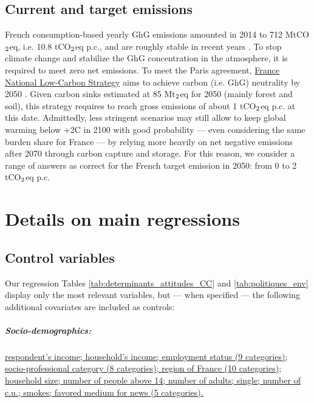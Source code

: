 \documentclass[english,5p,authoryear]{elsarticle}
\begin{document}
\begin{appendices}
\subsection{Current and target emissions\label{app:emission}}

French consumption-based yearly GhG emissions amounted in 2014 to 712 MtCO$_\textnormal{2}$eq, i.e. 10.8 tCO$_\textnormal{2}$eq p.c., and are roughly stable in recent years \citep{cgdd_chiffres_2019}. To stop climate change and stabilize the GhG concentration in the atmosphere, it is required to meet zero net emissions. To meet the Paris agreement,  \href{https://www.ecologique-solidaire.gouv.fr/strategie-nationale-bas-carbone-snbc}{France National Low-Carbon Strategy} aims to achieve carbon (i.e. GhG) neutrality by 2050 \citep{ministry_of_ecology_france_2015}. Given carbon sinks estimated at 85 Mt$_\textnormal{2}$eq for 2050 (mainly forest and soil), this strategy requires to reach gross emissions of about 1 tCO$_\textnormal{2}$eq p.c. at this date. Admittedly, less stringent scenarios may still allow to keep global warming below +2\textdegree{}C in 2100 with good probability --- even considering the same burden share for France --- by relying more heavily on net negative emissions after 2070 through carbon capture and storage. For this reason, we consider a range of answers as correct for the French target emission in 2050: from 0 to 2 tCO$_\textnormal{2}$eq p.c.

%

%
%
%
%
%
%
%
%
%
%
%
%
%
%
%
%
%
%
%
%
%
%



%
%
%
%
%
%
%
%
%
%
%
%
%
%
%
%
%
%
%
%
%
%
%
%
%
%
%
%
%
%
%
%
%
%
%
%
%
%
%
%
%
%
%
%
%
%
%
%
%
%
%
%
%
%
%
%
%

\section{Details on main regressions}
\subsection{Control variables\label{app:covariates}}

Our regression Tables \ref{tab:determinants_attitudes_CC} and \ref{tab:politiques_env} display only the most relevant variables, but --- when specified --- the following additional covariates are included as controls:

\subparagraph{Socio-demographics:} \uline{respondent's income; household's income; employment status \textnormal{(9 categories)}; socio-professional category \textnormal{(8 categories)}; region of France \textnormal{(10 categories)}; household size; number of people above 14; number of adults; single; number of c.u.; smokes; favored medium for news \textnormal{(5 categories)}.}


\end{appendices}
\end{document}

